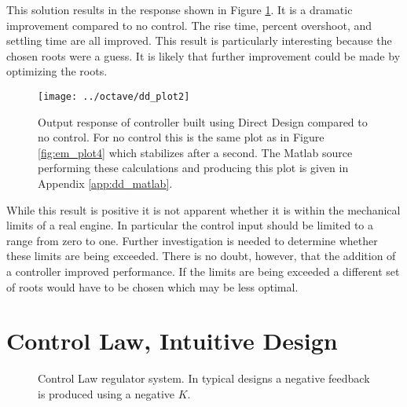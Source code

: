 \documentclass{article}
\begin{document}
This solution results in the response shown in Figure \ref{fig:dd_plot2}.
It is a dramatic improvement compared to no control.
The rise time, percent overshoot, and settling time are all improved.
This result is particularly interesting because the chosen roots were a guess.
It is likely that further improvement could be made by optimizing the roots.

\begin{figure}[htbp!]
\begin{center}
\texttt{[image: ../octave/dd\_plot2]}
\end{center}
\caption{Output response of controller built using Direct Design
compared to no control.  For no control this is the same plot
as in Figure \ref{fig:em_plot4} which stabilizes after a second.
The Matlab source performing these calculations and producing this
plot is given in Appendix \ref{app:dd_matlab}.}
\label{fig:dd_plot2}
\end{figure}

While this result is positive it is not apparent whether it is within
the mechanical limits of a real engine.
In particular the control input should be limited to a range from zero to one.
Further investigation is needed to determine whether these limits
are being exceeded.
There is no doubt, however, that the addition of a controller
improved performance.
If the limits are being exceeded a different set of roots would have to
be chosen which may be less optimal.


\clearpage
\section{Control Law, Intuitive Design}

\begin{figure}[hpb!]
\begin{center}


\end{center}

\caption{Control Law regulator system.
In typical designs a negative feedback is produced using a negative $K$.}
\label{fig:clid01}
\end{figure}
\end{document}
